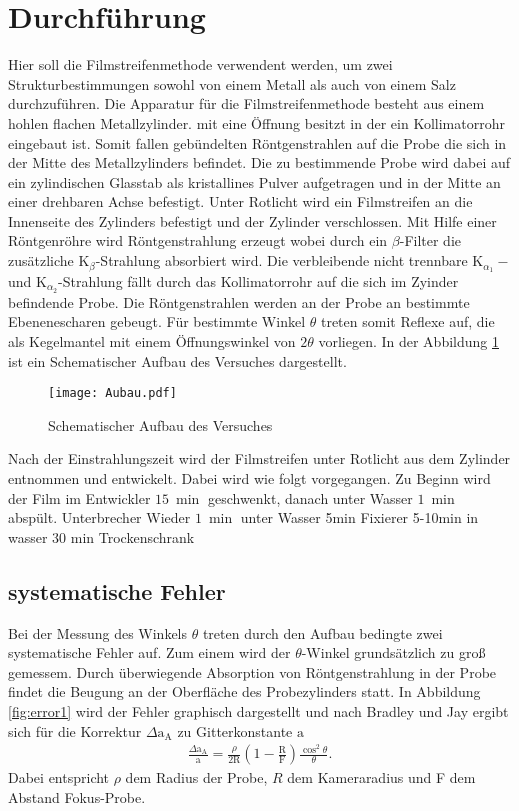 \section{Durchführung}
\label{sec:Durchführung}
Hier soll die Filmstreifenmethode verwendent werden,
um zwei Strukturbestimmungen
sowohl von einem Metall als auch von
einem Salz durchzuführen.
Die Apparatur für die Filmstreifenmethode besteht aus einem hohlen flachen Metallzylinder.
mit eine Öffnung besitzt in der ein Kollimatorrohr eingebaut ist.
Somit fallen gebündelten Röntgenstrahlen auf die Probe die sich in
der Mitte des Metallzylinders befindet.
Die zu bestimmende Probe wird dabei auf ein zylindischen Glasstab
als kristallines Pulver aufgetragen und in der Mitte an einer drehbaren
Achse befestigt. Unter Rotlicht wird ein Filmstreifen an die Innenseite
des Zylinders befestigt und der Zylinder verschlossen.
Mit Hilfe einer Röntgenröhre wird Röntgenstrahlung erzeugt
wobei durch ein $\beta$-Filter die zusätzliche
$\mathrm{K}_\beta$-Strahlung absorbiert wird.
Die verbleibende nicht trennbare  $\mathrm{K}_{\alpha_1}-$
und $\mathrm{K}_{\alpha_2}$-Strahlung fällt durch das Kollimatorrohr
auf die sich im Zyinder befindende Probe. Die Röntgenstrahlen werden an
der Probe an bestimmte Ebenenescharen gebeugt. Für bestimmte Winkel $\theta$ treten
somit Reflexe auf, die als Kegelmantel mit einem Öffnungswinkel von $2\theta$
vorliegen. In der Abbildung \ref{fig:aufbau} ist ein Schematischer Aufbau des Versuches dargestellt.
\begin{figure}
  \centering
  \texttt{[image: Aubau.pdf]}
  \caption{Schematischer Aufbau des Versuches  }
  \label{fig:aufbau}
 \end{figure}
Nach der Einstrahlungszeit wird der Filmstreifen unter Rotlicht
aus dem Zylinder entnommen und entwickelt.
Dabei wird wie folgt vorgegangen.
Zu Beginn wird der Film im Entwickler $\SI{15}{\min}$ geschwenkt,
danach unter Wasser $\SI{1}{\min}$ abspült.
Unterbrecher
Wieder $\SI{1}{\min}$ unter Wasser
5min Fixierer
5-10min in wasser
30 min Trockenschrank


\subsection{systematische Fehler}
Bei der Messung des Winkels $\theta$
treten durch den Aufbau bedingte zwei systematische Fehler auf.
Zum einem wird der $\theta$-Winkel grundsätzlich zu groß gemessem.
Durch überwiegende Absorption von Röntgenstrahlung in der Probe
findet die Beugung an der Oberfläche des
Probezylinders statt. In Abbildung \ref{fig:error1} wird
der Fehler graphisch dargestellt und nach Bradley und Jay
ergibt sich für die Korrektur
$\Delta \mathrm{a}_\mathrm{A}$
zu Gitterkonstante $\mathrm{a}$
\begin{align}
  \frac{\Delta \mathrm{a}_\mathrm{A}}{\mathrm{a}}=\frac{\rho}{2\mathrm{R}}\left(1-\frac{\mathrm{R}}{\mathrm{F}}\right)\frac{\cos^2\theta}{\theta}.
\end{align}
Dabei entspricht $\rho$ dem Radius der Probe, $R$ dem Kameraradius
und F dem Abstand Fokus-Probe.

